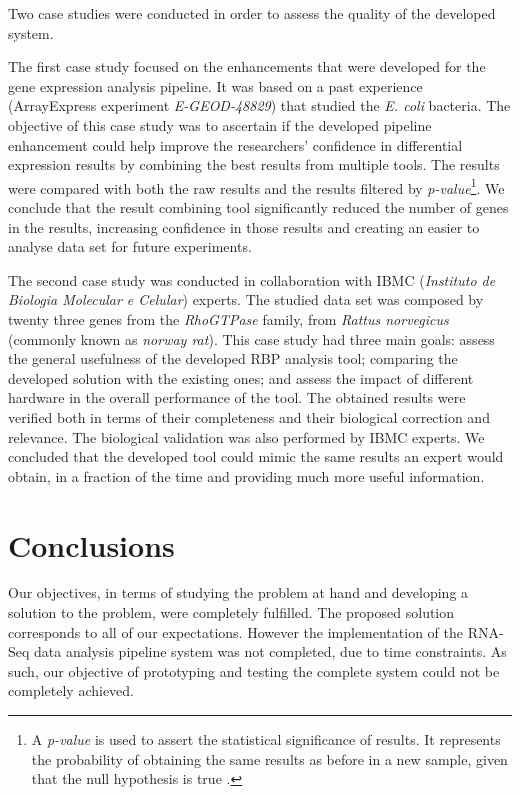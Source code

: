 \documentclass[9pt,a4paper]{extarticle}
\begin{document}
\begin{multicols}{2}
Two case studies were conducted in order to assess the quality of the developed
system.

The first case study focused on the enhancements that were developed for the
gene expression analysis pipeline. It was based on a past experience
(ArrayExpress experiment \emph{E-GEOD-48829}) that studied the \emph{E. coli}
bacteria. The objective of this case study was to ascertain if the developed
pipeline enhancement could help improve the researchers' confidence in
differential expression results by combining the best results from multiple
tools. The results were compared with both the raw results and the results
filtered by \emph{p-value}\footnote{A \emph{p-value} is used to assert the
statistical significance of results. It represents the probability of obtaining
the same results as before in a new sample, given that the null hypothesis is
true \cite{goodman45dirty}.}. We conclude that the result combining tool
significantly reduced the number of genes in the results, increasing confidence
in those results and creating an easier to analyse data set for future
experiments.

The second case study was conducted in collaboration with IBMC (\emph{Instituto
de Biologia Molecular e Celular}) experts. The studied data set was composed by
twenty three genes from the \emph{RhoGTPase} family, from \emph{Rattus
norvegicus} (commonly known as \emph{norway rat}). This case study had three
main goals: assess the general usefulness of the developed RBP analysis tool;
comparing the developed solution with the existing ones; and assess the impact
of different hardware in the overall performance of the tool. The obtained
results were verified both in terms of their completeness and their biological
correction and relevance. The biological validation was also performed by IBMC
experts. We concluded that the developed tool could mimic the same results an
expert would obtain, in a fraction of the time and providing much more useful
information.

\section{Conclusions}

Our objectives, in terms of studying the problem at hand and developing a
solution to the problem, were completely fulfilled. The proposed solution
corresponds to all of our expectations. However the implementation of the
RNA-Seq data analysis pipeline system was not completed, due to time
constraints. As such, our objective of prototyping and testing the complete
system could not be completely achieved.


\end{multicols}
\end{document}
